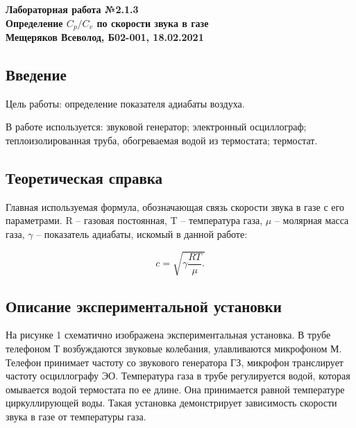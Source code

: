 \documentclass[a4paper, fontsize = 14pt]{article}
\begin{document}
 
\begin{center} \large\textbf{
Лабораторная работа №2.1.3 \\ Определение $C_p/C_v$ по скорости звука в газе \\
Мещеряков Всеволод, Б02-001, 18.02.2021}
\end{center} 

\subsection*{Введение}

Цель работы: определение показателя адиабаты воздуха.

В работе используется: звуковой генератор; электронный осциллограф; теплоизолированная труба, обогреваемая водой из термостата; термостат.

\subsection*{Теоретическая справка}

Главная используемая формула, обозначающая связь скорости звука в газе с его параметрами. R – газовая постоянная, T – температура газа, $\mu$ – молярная масса газа, $\gamma$ – показатель адиабаты, искомый в данной работе:

\begin{equation}
 c = \sqrt{\gamma\frac{RT}{\mu}.} 
\end{equation}

\subsection*{Описание экспериментальной установки}

На рисунке 1 схематично изображена экспериментальная установка. В трубе телефоном Т возбуждаются звуковые колебания, улавливаются микрофоном М. Телефон принимает частоту со звукового генератора ГЗ, микрофон транслирует частоту осциллографу ЭО. Температура газа в трубе регулируется водой, которая омывается водой термостата по ее длине. Она принимается равной температуре циркуллирующей воды. Такая установка демонстрирует зависимость скорости звука в газе от температуры газа.
\end{document}
